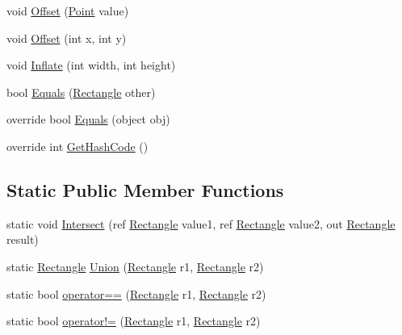 \begin{DoxyCompactItemize}
\item 
void \hyperlink{struct_microsoft_1_1_xna_1_1_framework_1_1_rectangle_a30787869083eb46b0e015b25dfb47e99}{Offset} (\hyperlink{struct_microsoft_1_1_xna_1_1_framework_1_1_point}{Point} value)
\item 
void \hyperlink{struct_microsoft_1_1_xna_1_1_framework_1_1_rectangle_a47c3d3bf439392083ac93d89bbebc062}{Offset} (int x, int y)
\item 
void \hyperlink{struct_microsoft_1_1_xna_1_1_framework_1_1_rectangle_a7a09bca5acb879b258aa946e27640d91}{Inflate} (int width, int height)
\item 
bool \hyperlink{struct_microsoft_1_1_xna_1_1_framework_1_1_rectangle_ac4b705da739dce8bd038e090883065e6}{Equals} (\hyperlink{struct_microsoft_1_1_xna_1_1_framework_1_1_rectangle}{Rectangle} other)
\item 
override bool \hyperlink{struct_microsoft_1_1_xna_1_1_framework_1_1_rectangle_aa0a857f535862d783afcde146282a135}{Equals} (object obj)
\item 
override int \hyperlink{struct_microsoft_1_1_xna_1_1_framework_1_1_rectangle_a9906a1f483aa4f43a00b1b4d7a51be86}{Get\+Hash\+Code} ()
\end{DoxyCompactItemize}
\subsection*{Static Public Member Functions}
\begin{DoxyCompactItemize}
\item 
static void \hyperlink{struct_microsoft_1_1_xna_1_1_framework_1_1_rectangle_a4404fe4da546a6401d67c81430207559}{Intersect} (ref \hyperlink{struct_microsoft_1_1_xna_1_1_framework_1_1_rectangle}{Rectangle} value1, ref \hyperlink{struct_microsoft_1_1_xna_1_1_framework_1_1_rectangle}{Rectangle} value2, out \hyperlink{struct_microsoft_1_1_xna_1_1_framework_1_1_rectangle}{Rectangle} result)
\item 
static \hyperlink{struct_microsoft_1_1_xna_1_1_framework_1_1_rectangle}{Rectangle} \hyperlink{struct_microsoft_1_1_xna_1_1_framework_1_1_rectangle_a64e17dd03d88a837d81f3e62cf18c938}{Union} (\hyperlink{struct_microsoft_1_1_xna_1_1_framework_1_1_rectangle}{Rectangle} r1, \hyperlink{struct_microsoft_1_1_xna_1_1_framework_1_1_rectangle}{Rectangle} r2)
\item 
static bool \hyperlink{struct_microsoft_1_1_xna_1_1_framework_1_1_rectangle_aab4180062529aad77b4f716674819eea}{operator==} (\hyperlink{struct_microsoft_1_1_xna_1_1_framework_1_1_rectangle}{Rectangle} r1, \hyperlink{struct_microsoft_1_1_xna_1_1_framework_1_1_rectangle}{Rectangle} r2)
\item 
static bool \hyperlink{struct_microsoft_1_1_xna_1_1_framework_1_1_rectangle_a956940907e63b6763607e84e1a1795b1}{operator!=} (\hyperlink{struct_microsoft_1_1_xna_1_1_framework_1_1_rectangle}{Rectangle} r1, \hyperlink{struct_microsoft_1_1_xna_1_1_framework_1_1_rectangle}{Rectangle} r2)
\end{DoxyCompactItemize}
